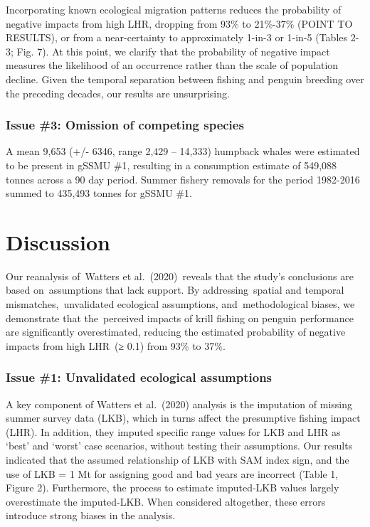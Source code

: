 \documentclass[]{elsarticle} %
\begin{document}
Incorporating known ecological migration patterns reduces the
probability of negative impacts from high LHR, dropping from 93\% to
21\%-37\% (POINT TO RESULTS), or from a near-certainty to approximately
1-in-3 or 1-in-5 (Tables 2-3; Fig. 7). At this point, we clarify that
the probability of negative impact measures the likelihood of an
occurrence rather than the scale of population decline. Given the
temporal separation between fishing and penguin breeding over the
preceding decades, our results are unsurprising.

\subsubsection{Issue \#3: Omission of competing
species}\label{issue-3-omission-of-competing-species-1}

A mean 9,653 (+/- 6346, range 2,429 -- 14,333) humpback whales were
estimated to be present in gSSMU \#1, resulting in a consumption
estimate of 549,088 tonnes across a 90 day period. Summer fishery
removals for the period 1982-2016 summed to 435,493 tonnes for gSSMU
\#1.

\section{Discussion}\label{discussion}

Our reanalysis of~Watters et al.~(2020)~reveals that the study's
conclusions are based on~assumptions that lack support. By
addressing~spatial and temporal mismatches,~unvalidated ecological
assumptions, and~methodological biases, we demonstrate that
the~perceived impacts of krill fishing on penguin performance are
significantly overestimated, reducing the estimated probability of
negative impacts from high LHR~(≥ 0.1) from 93\% to 37\%.

\subsubsection{Issue \#1: Unvalidated ecological
assumptions}\label{issue-1-unvalidated-ecological-assumptions}

A key component of Watters et al.~(2020) analysis is the imputation of
missing summer survey data (LKB), which in turns affect the presumptive
fishing impact (LHR). In addition, they imputed specific range values
for LKB and LHR as `best' and `worst' case scenarios, without testing
their assumptions. Our results indicated that the assumed relationship
of LKB with SAM index sign, and the use of LKB = 1 Mt for assigning good
and bad years are incorrect (Table 1, Figure 2). Furthermore, the
process to estimate imputed-LKB values largely overestimate the
imputed-LKB. When considered altogether, these errors introduce strong
biases in the analysis.
\end{document}
